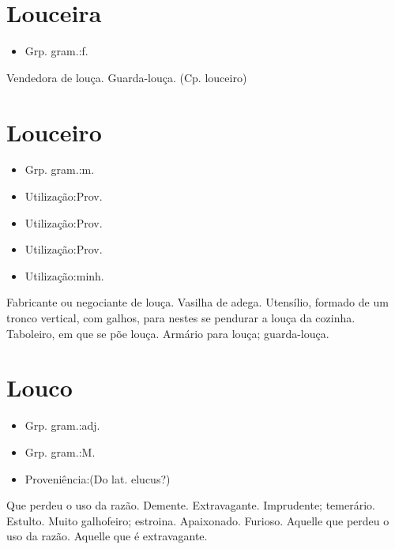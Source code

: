 \section{Louceira}
\begin{itemize}
\item {Grp. gram.:f.}
\end{itemize}
Vendedora de louça.
Guarda-louça.
(Cp. \textunderscore louceiro\textunderscore )
\section{Louceiro}
\begin{itemize}
\item {Grp. gram.:m.}
\end{itemize}
\begin{itemize}
\item {Utilização:Prov.}
\end{itemize}
\begin{itemize}
\item {Utilização:Prov.}
\end{itemize}
\begin{itemize}
\item {Utilização:Prov.}
\end{itemize}
\begin{itemize}
\item {Utilização:minh.}
\end{itemize}
Fabricante ou negociante de louça.
Vasilha de adega.
Utensílio, formado de um tronco vertical, com galhos, para nestes se pendurar a louça da cozinha.
Taboleiro, em que se põe louça.
Armário para louça; guarda-louça.
\section{Louco}
\begin{itemize}
\item {Grp. gram.:adj.}
\end{itemize}
\begin{itemize}
\item {Grp. gram.:M.}
\end{itemize}
\begin{itemize}
\item {Proveniência:(Do lat. \textunderscore elucus\textunderscore ?)}
\end{itemize}
Que perdeu o uso da razão.
Demente.
Extravagante.
Imprudente; temerário.
Estulto.
Muito galhofeiro; estroina.
Apaixonado.
Furioso.
Aquelle que perdeu o uso da razão.
Aquelle que é extravagante.
